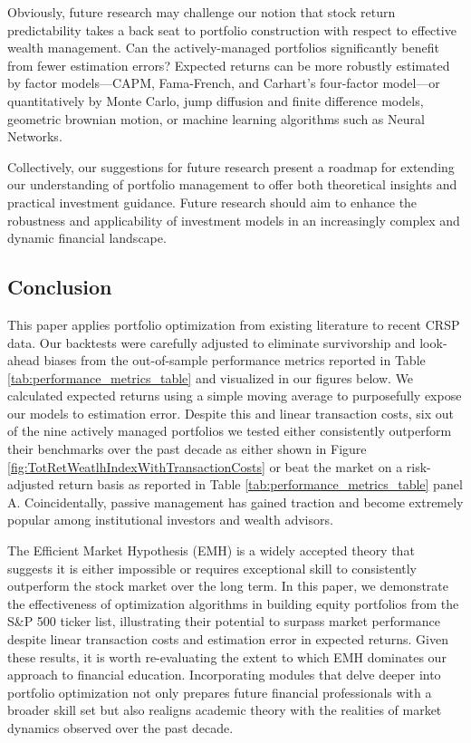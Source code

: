 \documentclass[12pt,letterpaper]{article}
\begin{document}
Obviously, future research may challenge our notion that stock return predictability takes a back seat to portfolio construction with respect to effective wealth management. Can the actively-managed portfolios significantly benefit from fewer estimation errors? Expected returns can be more robustly estimated by factor models---CAPM, Fama-French, and Carhart's four-factor model---or quantitatively by Monte Carlo, jump diffusion and finite difference models, geometric brownian motion, or machine learning algorithms such as Neural Networks.

Collectively, our suggestions for future research present a roadmap for extending our understanding of portfolio management to offer both theoretical insights and practical investment guidance. Future research should aim to enhance the robustness and applicability of investment models in an increasingly complex and dynamic financial landscape.

\subsection{Conclusion}

This paper applies portfolio optimization from existing literature to recent CRSP data. Our backtests were carefully adjusted to eliminate survivorship and look-ahead biases from the out-of-sample performance metrics reported in Table \ref{tab:performance_metrics_table} and visualized in our figures below. We calculated expected returns using a simple moving average to purposefully expose our models to estimation error. Despite this and linear transaction costs, six out of the nine actively managed portfolios we tested either consistently outperform their benchmarks over the past decade as either shown in Figure \ref{fig:TotRetWeatlhIndexWithTransactionCosts} or beat the market on a risk-adjusted return basis as reported in Table \ref{tab:performance_metrics_table} panel A. Coincidentally, passive management has gained traction and become extremely popular among institutional investors and wealth advisors.

The Efficient Market Hypothesis (EMH) is a widely accepted theory that suggests it is either impossible or requires exceptional skill to consistently outperform the stock market over the long term. In this paper, we demonstrate the effectiveness of optimization algorithms in building equity portfolios from the S\&P 500 ticker list, illustrating their potential to surpass market performance despite linear transaction costs and estimation error in expected returns. Given these results, it is worth re-evaluating the extent to which EMH dominates our approach to financial education. Incorporating modules that delve deeper into portfolio optimization not only prepares future financial professionals with a broader skill set but also realigns academic theory with the realities of market dynamics observed over the past decade.
    
\end{document}
